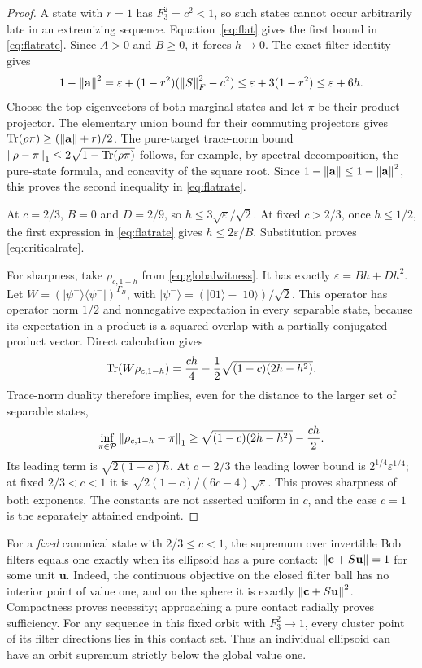 \begin{proof}
A state with $r=1$ has $F_3^2=c^2<1$, so such states cannot occur arbitrarily
late in an extremizing sequence. Equation~\eqref{eq:flat} gives the first
bound in \eqref{eq:flatrate}. Since $A>0$ and $B\geq0$, it forces $h\to0$.
The exact filter identity gives
\[
1-\left\lVert\mathbf a\right\rVert^2=\varepsilon+(1-r^2)(\left\lVert S\right\rVert_F^2-c^2)
\leq\varepsilon+3(1-r^2)\leq\varepsilon+6h.
\]
Choose the top eigenvectors of both marginal states and let $\pi$ be their
product projector. The elementary union bound for their commuting projectors
gives $\operatorname{Tr}(\rho\pi)\geq(\left\lVert\mathbf a\right\rVert+r)/2$. The pure-target trace-norm bound
$\left\lVert\rho-\pi\right\rVert_1\leq2\sqrt{1-\operatorname{Tr}(\rho\pi)}$ follows, for example, by
spectral decomposition, the pure-state formula, and concavity of the square
root. Since $1-\left\lVert\mathbf a\right\rVert\leq1-\left\lVert\mathbf a\right\rVert^2$, this proves
the second inequality in \eqref{eq:flatrate}.

At $c=2/3$, $B=0$ and $D=2/9$, so
$h\leq3\sqrt{\varepsilon}/\sqrt2$. At fixed $c>2/3$, once $h\leq1/2$,
the first expression in \eqref{eq:flatrate} gives
$h\leq2\varepsilon/B$. Substitution proves \eqref{eq:criticalrate}.

For sharpness, take $\rho_{c,1-h}$ from \eqref{eq:globalwitness}.
It has exactly $\varepsilon=Bh+Dh^2$. Let
$W=(|\psi^-\rangle\langle\psi^-|)^{\Gamma_B}$, with
$|\psi^-\rangle=(|01\rangle-|10\rangle)/\sqrt2$.
This operator has operator norm $1/2$ and nonnegative expectation in every separable
state, because its expectation in a product is a squared overlap with a
partially conjugated product vector. Direct calculation gives
\[
\operatorname{Tr}(W\rho_{c,1-h})=\frac{ch}{4}
-\frac12\sqrt{(1-c)(2h-h^2)}.
\]
Trace-norm duality therefore implies, even for the distance to the larger
set of separable states,
\begin{equation}\label{eq:flatlower}
\inf_{\pi\in\mathcal P}\left\lVert\rho_{c,1-h}-\pi\right\rVert_1
\geq\sqrt{(1-c)(2h-h^2)}-\frac{ch}{2}.
\end{equation}
Its leading term is $\sqrt{2(1-c)h}$. At $c=2/3$ the leading lower bound is
$2^{1/4}\varepsilon^{1/4}$; at fixed $2/3<c<1$ it is
$\sqrt{2(1-c)/(6c-4)}\sqrt\varepsilon$. This proves sharpness of both
exponents. The constants are not asserted uniform in $c$, and the case
$c=1$ is the separately attained endpoint.
\end{proof}

For a \emph{fixed} canonical state with $2/3\leq c<1$, the supremum over
invertible Bob filters equals one exactly when its ellipsoid has a pure
contact: $\left\lVert\mathbf c+S\mathbf u\right\rVert=1$ for some unit $\mathbf u$.
Indeed, the continuous objective on the closed filter ball has no interior
point of value one, and on the sphere it is exactly
$\left\lVert\mathbf c+S\mathbf u\right\rVert^2$. Compactness proves necessity; approaching a pure
contact radially proves sufficiency. For any sequence in this fixed orbit
with $F_3^2\to1$, every cluster point of its filter directions lies in this
contact set. Thus an individual ellipsoid can
have an orbit supremum strictly below the global value one.
